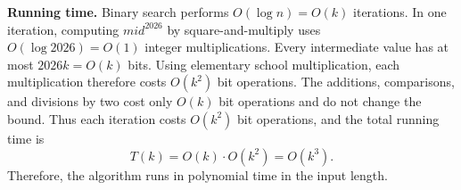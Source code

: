 \begin{loigiai}
\textbf{Running time.}
Binary search performs $O(\log n)=O(k)$ iterations.  In one iteration,
computing $mid^{2026}$ by square-and-multiply uses
$O(\log 2026)=O(1)$ integer multiplications.  Every intermediate value
has at most $2026k=O(k)$ bits.  Using elementary school multiplication,
each multiplication therefore costs $O(k^2)$ bit operations.  The
additions, comparisons, and divisions by two cost only $O(k)$ bit
operations and do not change the bound.  Thus each iteration costs
$O(k^2)$ bit operations, and the total running time is
\[
\boxed{T(k)=O(k)\cdot O(k^2)=O(k^3)}.
\]
Therefore, the algorithm runs in polynomial time in the input length.
\end{loigiai}
